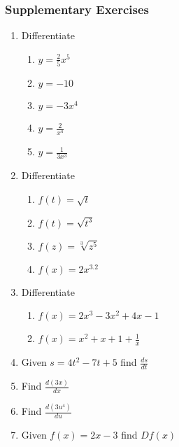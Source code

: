 \subsubsection{Supplementary Exercises}
\columnsep=30pt
\begin{multicols}{2}
	
	\begin{enumerate}
		\item Differentiate 
		
		
		\begin{enumerate}
			\item $y =\frac{2}{5} x^{5}$ 
			
			\item $y = -10$ 
			
			\item $y = -3 x^{4}$ 
			
			\item $y =\frac{2}{x^{4}}$ 
			
			\item $y =\frac{1}{3 x^{3}}$ \end{enumerate}
		
		
		\item Differentiate 
		
		
		\begin{enumerate}
			\item $f (t) =\sqrt{t}$ 
			
			\item $f (t) =\sqrt{t^{3}}$ 
			
			\item $f (z) =\sqrt[{3}]{z^{5}}$ 
			
			\item $f (x) =2 x^{3.2}$ \end{enumerate}
		
		
		\item Differentiate 
		
		
		\begin{enumerate}
			\item $f (x) =2 x^{3} -3 x^{2} +4 x -1$ 
			
			\item $f (x) =x^{2} +x +1 +\frac{1}{x}$ \end{enumerate}
		
		
		\item Given $s =4 t^{2} -7 t +5$ find $\frac{d s}{d t}$ 
		
		\item Find $\frac{d \left (3 x\right )}{d x}$ 
		
		\item Find $\frac{d \left (3 u^{4}\right )}{d u}$ 
		
		\item Given $f (x) =2 x -3$ find $D f (x)$ \end{enumerate}
\end{multicols}


